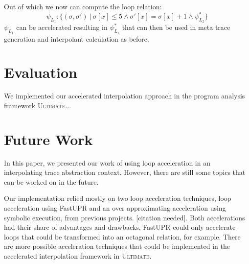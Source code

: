 \documentclass{article}
\newcounter{example}[section]
\begin{document}
\begin{figure}[H]
    \centering
\end{figure}
Out of which we now can compute the loop relation:
\begin{equation*}
    \psi_{L_{1}}: \{(\sigma, \sigma')\ |\ \sigma[x] \leq 5 \land \sigma'[x] = \sigma[x] + 1 \land \psi_{L_{2}}^* \}
\end{equation*}
$\psi_{L_{1}}$ can be accelerated resulting in $\psi_{L_{1}}^*$ that can then be used in meta trace generation and interpolant calculation as before.

\section{Evaluation}
We implemented our accelerated interpolation approach in the program analysis framework \textsc{Ultimate}...

\section{Future Work}
In this paper, we presented our work of using loop acceleration in an interpolating trace abstraction context. However, there are still some topics that can be worked on in the future. \\ \par
Our implementation relied mostly on two loop acceleration techniques, loop acceleration using FastUPR and an over approximating acceleration using symbolic execution, from previous projects. [citation needed]. Both accelerations had their share of advantages and drawbacks, FastUPR could only accelerate loops that could be transformed into an octagonal relation, for example. There are more possible acceleration techniques that could be implemented in the accelerated interpolation framework in \textsc{Ultimate}. \\ \par
\end{document}
